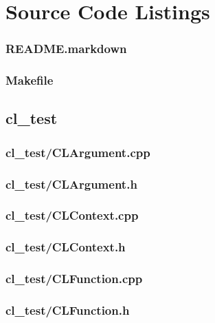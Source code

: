 \documentclass{article}
\begin{document}



\iffalse
\appendix
\section{Source Code Listings}

\subsubsection*{README.markdown}


\subsubsection*{Makefile}


\subsection*{cl\_test}
\subsubsection*{cl\_test/CLArgument.cpp}


\subsubsection*{cl\_test/CLArgument.h}


\subsubsection*{cl\_test/CLContext.cpp}


\subsubsection*{cl\_test/CLContext.h}


\subsubsection*{cl\_test/CLFunction.cpp}


\subsubsection*{cl\_test/CLFunction.h}

\end{document}
